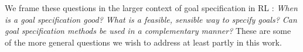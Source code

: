 \documentclass[../thesis-proposal/main.tex]{subfiles}
\begin{document}
We frame these questions in the larger context of goal specification in RL
\citep{white_unifying_2017, liu_goal-conditioned_2022, bansal_specification-guided_2022}:
\textit{When is a goal specification good? What is a feasible, sensible way to specify goals? Can
goal specification methods be used in a complementary manner?} These are some of the more general
questions we wish to address at least partly in this work.

\ifSubfilesClassLoaded{%
  
}{}
\end{document}
